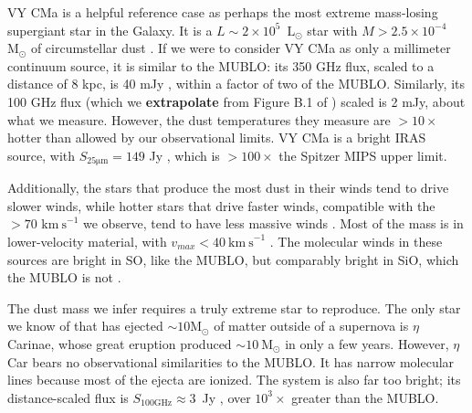 \documentclass[]{aastex631}
\newcommand{\msun}{\ensuremath{\mathrm{M}_\odot}\xspace}
\newcommand{\lsun}{\ensuremath{\mathrm{L}_\odot}\xspace}
\newcommand{\kms}{\ensuremath{\mathrm{km~s}^{-1}}\xspace}
\newcommand{\um}{\ensuremath{\mathrm{\mu m}}\xspace}
\def\rr#1{\textbf{#1}}
\begin{document}
VY CMa is a helpful reference case as perhaps the most extreme mass-losing supergiant star in the Galaxy.
It is a $L\sim2\times10^5$~\lsun \citep{Monnier1999} star with $M>2.5\times10^{-4}$~\msun of circumstellar dust \citep[$M>2.5\times10^{-2}$~\msun of gas using our gas-to-dust ratio;][but see \citealt{Kaminski2019}, who model dust mass as much as 100$\times$ higher]{O'Gorman2015}.
If we were to consider VY CMa as only a millimeter continuum source, it is similar to the MUBLO: its 350 GHz flux, scaled to a distance of 8 kpc, is 40 mJy \citep{O'Gorman2015,Kaminski2013}, within a factor of two of the MUBLO.
Similarly, its 100 GHz flux (which we \rr{extrapolate} from Figure B.1 of \citealt{O'Gorman2015}) scaled is 2 mJy, about what we measure.
However, the dust temperatures they measure are $>10\times$ hotter than allowed by our observational limits.
VY CMa is a bright IRAS source, with $S_{25\um}=149$ Jy \citep[scaled to $d$=8~kpc,][]{1988iras....7.....H,Matsuura2014}, which is $>100\times$ the Spitzer MIPS upper limit.


Additionally, the stars that produce the most dust in their winds tend to drive slower winds, while hotter stars that drive faster winds, compatible with the $>70$ \kms we observe, tend to have less massive winds \citep[e.g., the fastest winds in a sample of mass-losing giants, VY CMa and IRC+10240, have FWHM$\sim60$~\kms, less than half of the MUBLO's;][]{Kemper2003,Quintana-Lacaci2023}.
Most of the mass is in lower-velocity material, with $v_{max} < 40~ \kms$ \citep{Quintana-Lacaci2023}.
The molecular winds in these sources are bright in SO, like the MUBLO, but comparably bright in SiO, which the MUBLO is not \citep{Kaminski2013,Matsuura2014,Quintana-Lacaci2023}.

The dust mass we infer requires a truly extreme star to reproduce.
The only star we know of that has ejected $\sim10\msun$ of matter outside of a supernova is $\eta$ Carinae, whose great eruption produced $\sim10~\msun$ in only a few years.
However, $\eta$ Car bears no observational similarities to the MUBLO.
It has narrow molecular lines \citep{Bordiu2022} because most of the ejecta are ionized.
The system is also far too bright; its distance-scaled flux is $S_{\mathrm{100 GHz}}\approx3$~Jy \citep{Morris2020}, over $10^3\times$ greater than the MUBLO.
\end{document}
